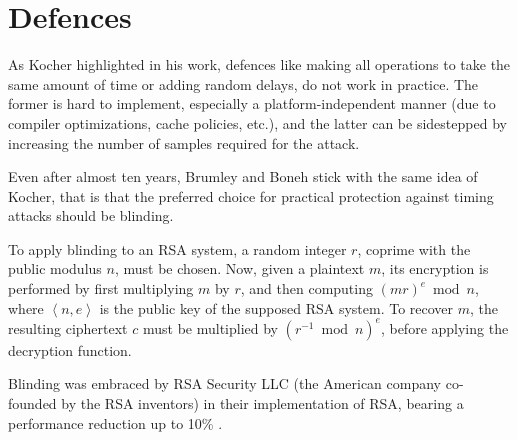 \section{Defences}

As Kocher highlighted in his work, defences like making all operations to take the same amount of time or adding random delays, do not work in practice. The former is hard to implement, especially a platform-independent manner (due to compiler optimizations, cache policies, etc.), and the latter can be sidestepped by increasing the number of samples required for the attack.

Even after almost ten years, Brumley and Boneh stick with the same idea of Kocher, that is that the preferred choice for practical protection against timing attacks should be blinding.

To apply blinding to an RSA system, a random integer $r$, coprime with the public modulus $n$, must be chosen. Now, given a plaintext $m$, its encryption is performed by first multiplying $m$ by $r$, and then computing $(mr)^e \bmod n$, where $\left< n, e \right>$ is the public key of the supposed RSA system. To recover $m$, the resulting ciphertext $c$ must be multiplied by $(r^{-1} \bmod n)^e$, before applying the decryption function.

Blinding was embraced by RSA Security LLC (the American company co-founded by the RSA inventors) in their implementation of RSA, bearing a performance reduction up to 10\% \cite{bib:boreale}.


